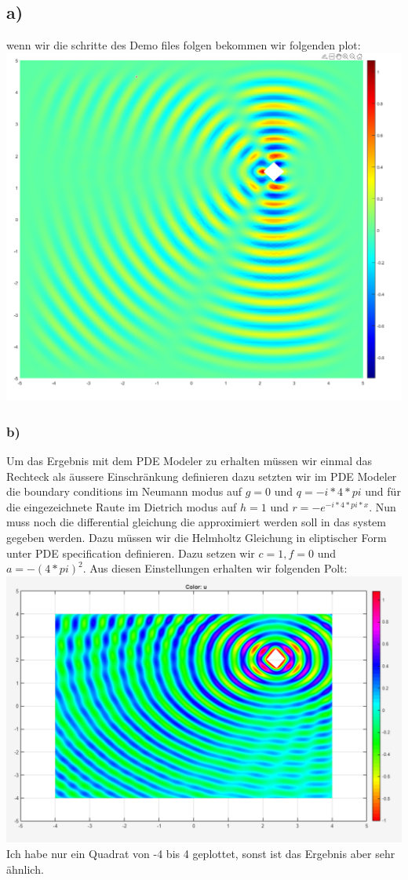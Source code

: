 \documentclass{scrartcl}
\begin{document}
\subsection*{a)}
wenn wir die schritte des Demo files folgen bekommen wir folgenden plot:\\
\includegraphics[scale=0.5]{Helmholzplot.png}\\
\subsubsection{b)}
Um das Ergebnis mit dem PDE Modeler zu erhalten müssen wir einmal das Rechteck als äussere Einschränkung definieren dazu setzten wir im PDE Modeler die boundary conditions im Neumann modus auf $g=0$ und $q=-i*4*pi$ und für die eingezeichnete Raute im Dietrich modus auf $h = 1$ und $r = -e^{-i*4*pi*x}$. Nun muss noch die differential gleichung die approximiert werden soll in das system gegeben werden. Dazu müssen wir die Helmholtz Gleichung in eliptischer Form unter PDE specification definieren. Dazu setzen wir $c =1,f=0$ und $a=-(4*pi)^2$. Aus diesen Einstellungen erhalten wir folgenden Polt:\\
\includegraphics[scale=0.6]{Helmholzplotmodeler.png}\\
Ich habe nur ein Quadrat von -4 bis 4 geplottet, sonst ist das Ergebnis aber sehr ähnlich.\\
\end{document}
